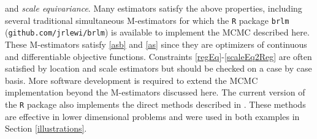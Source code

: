 \documentclass[ba]{imsart}
\makeatletter
\def\bbeta{\mbox{\boldmath $\beta$}}
\newcommand{\by}{\mbox{\boldmath $y$}}
\newcommand{\bv}{\mbox{\boldmath $v$}}
\newcommand{\bb}{\mbox{\boldmath $b$}}
\newcommand{\response}[1]{{\color{blue}#1}}
\newcommand{\labitem}[2]{%
\def\@itemlabel{\textbf{#1}{.}}
\item
\def\@currentlabel{#1}\label{#2}}
\makeatother
\begin{document}
and \textit{scale equivariance}. 
Many estimators satisfy the above properties, including several traditional simultaneous M-estimators \citep{huber2009, maronna2006} for which the \texttt{R} package \texttt{brlm} (\texttt{github.com/jrlewi/brlm}) is available to implement the MCMC described here. 
\response{These M-estimators satisfy \ref{asb} and \ref{as} since they are optimizers of continuous and differentiable objective functions. Constraints \ref{regEq}-\ref{scaleEq2Reg} are often satisfied by location and scale estimators but should be checked on a case by case basis.}  
More software development is required to extend the MCMC implementation beyond the M-estimators discussed here. The current version of the \texttt{R} package also implements the direct methods described in \cite{lewis2014}. These methods are effective in lower dimensional problems and were used in both examples in Section \ref{illustrations}.

\end{document}
